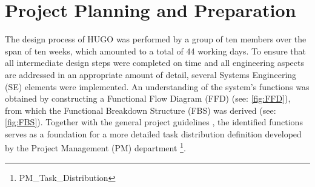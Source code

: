 \chapter{Project Planning and Preparation}
\label{ch:planning}
The design process of HUGO was performed by a group of ten members over the span of ten weeks, which amounted to a total of 44 working days. To ensure that all intermediate design steps were completed on time and all engineering aspects are addressed in an appropriate amount of detail, several Systems Engineering (SE) elements were implemented. An understanding of the system's functions was obtained by constructing a Functional Flow Diagram (FFD) (see: \autoref{fig:FFD}), from which the Functional Breakdown Structure (FBS) was derived (see: \autoref{fig:FBS}). Together with the general project guidelines \cite{Castro2026}, the identified functions serves as a foundation for a more detailed task distribution definition developed by the Project Management (PM) department \footnote{PM\_Task\_Distribution}.


